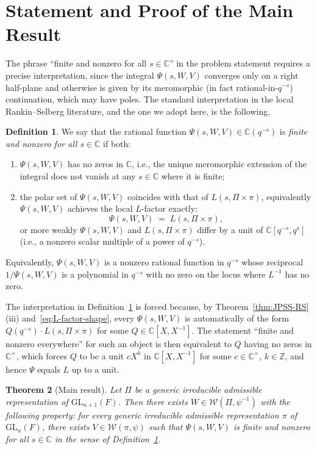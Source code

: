 \documentclass[12pt]{article}
\newtheorem{theorem}{Theorem}
\theoremstyle{definition}
\newtheorem{definition}[theorem]{Definition}
\begin{document}
\section{Statement and Proof of the Main Result}

The phrase ``finite and nonzero for all $s\in\mathbb{C}$'' in the problem statement requires a precise interpretation, since the integral $\Psi(s,W,V)$ converges only on a right half-plane and otherwise is given by its meromorphic (in fact rational-in-$q^{-s}$) continuation, which may have poles. The standard interpretation in the local Rankin--Selberg literature, and the one we adopt here, is the following.

\begin{definition}\label{def:finite-nonzero}
We say that the rational function $\Psi(s,W,V)\in\mathbb{C}(q^{-s})$ is \emph{finite and nonzero for all $s\in\mathbb{C}$} if both:
\begin{enumerate}
\item[(a)] $\Psi(s,W,V)$ has no zeros in $\mathbb{C}$, i.e., the unique meromorphic extension of the integral does not vanish at any $s\in\mathbb{C}$ where it is finite;
\item[(b)] the polar set of $\Psi(s,W,V)$ coincides with that of $L(s,\Pi\times\pi)$, equivalently $\Psi(s,W,V)$ achieves the local $L$-factor exactly:
$$\Psi(s,W,V)\;=\;L(s,\Pi\times\pi),$$
or more weakly $\Psi(s,W,V)$ and $L(s,\Pi\times\pi)$ differ by a unit of $\mathbb{C}[q^{-s},q^s]$ (i.e., a nonzero scalar multiple of a power of $q^{-s}$).
\end{enumerate}
Equivalently, $\Psi(s,W,V)$ is a nonzero rational function in $q^{-s}$ whose reciprocal $1/\Psi(s,W,V)$ is a polynomial in $q^{-s}$ with no zero on the locus where $L^{-1}$ has no zero.
\end{definition}

\noindent The interpretation in Definition~\ref{def:finite-nonzero} is forced because, by Theorem~\ref{thm:JPSS-RS}(iii) and~\eqref{eq:L-factor-shape}, every $\Psi(s,W,V)$ is automatically of the form $Q(q^{-s})\cdot L(s,\Pi\times\pi)$ for some $Q\in\mathbb{C}[X,X^{-1}]$. The statement ``finite and nonzero everywhere'' for such an object is then equivalent to $Q$ having no zeros in $\mathbb{C}^\times$, which forces $Q$ to be a unit $cX^k$ in $\mathbb{C}[X,X^{-1}]$ for some $c\in\mathbb{C}^\times$, $k\in\mathbb{Z}$, and hence $\Psi$ equals $L$ up to a unit.

\begin{theorem}[Main result]\label{thm:main}
Let $\Pi$ be a generic irreducible admissible representation of $\mathrm{GL}_{n+1}(F)$. Then there exists $W\in\mathcal{W}(\Pi,\psi^{-1})$ with the following property: for every generic irreducible admissible representation $\pi$ of $\mathrm{GL}_n(F)$, there exists $V\in\mathcal{W}(\pi,\psi)$ such that $\Psi(s,W,V)$ is finite and nonzero for all $s\in\mathbb{C}$ in the sense of Definition~\ref{def:finite-nonzero}.
\end{theorem}
\end{document}
